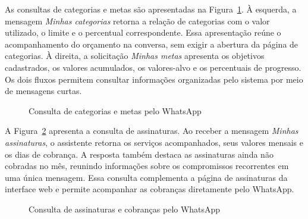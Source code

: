 As consultas de categorias e metas são apresentadas na Figura~\ref{fig:wa-categorias-metas}. À esquerda, a mensagem \textit{Minhas categorias} retorna a relação de categorias com o valor utilizado, o limite e o percentual correspondente. Essa apresentação reúne o acompanhamento do orçamento na conversa, sem exigir a abertura da página de categorias. À direita, a solicitação \textit{Minhas metas} apresenta os objetivos cadastrados, os valores acumulados, os valores-alvo e os percentuais de progresso. Os dois fluxos permitem consultar informações organizadas pelo sistema por meio de mensagens curtas.

\begin{figure}[H]
    \centering
    \setlength{\larguraPrint}{0.44\textwidth}
    \caption{Consulta de categorias e metas pelo WhatsApp}
    \label{fig:wa-categorias-metas}
    \begin{minipage}[t]{0.48\textwidth}
        \vspace{0pt}\centering
    \end{minipage}
    \hfill
    \begin{minipage}[t]{0.48\textwidth}
        \vspace{0pt}\centering
    \end{minipage}
\end{figure}

A Figura~\ref{fig:wa-assinaturas} apresenta a consulta de assinaturas. Ao receber a mensagem \textit{Minhas assinaturas}, o assistente retorna os serviços acompanhados, seus valores mensais e os dias de cobrança. A resposta também destaca as assinaturas ainda não cobradas no mês, reunindo informações sobre os compromissos recorrentes em uma única mensagem. Essa consulta complementa a página de assinaturas da interface web e permite acompanhar as cobranças diretamente pelo WhatsApp.

\begin{figure}[H]
    \centering
    \setlength{\larguraPrint}{0.55\textwidth}
    \caption{Consulta de assinaturas e cobranças pelo WhatsApp}
    \label{fig:wa-assinaturas}
\end{figure}

